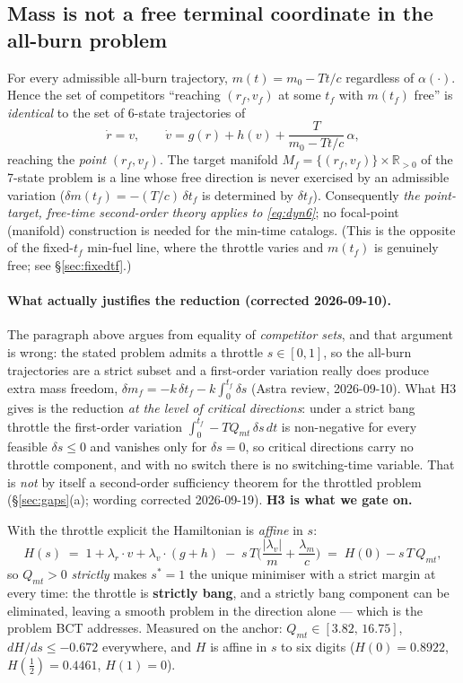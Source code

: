\documentclass[11pt]{article}
\theoremstyle{definition}
\newcommand{\R}{\mathbb{R}}
\newcommand{\lv}{\lambda_v}
\newcommand{\lr}{\lambda_r}
\newcommand{\lm}{\lambda_m}
\newcommand{\tf}{t_f}
\begin{document}
\subsection{Mass is not a free terminal coordinate in the all-burn problem}
For every admissible all-burn trajectory, $m(t)=m_0-Tt/c$ regardless of
$\alpha(\cdot)$. Hence the set of competitors ``reaching $(r_f,v_f)$ at some
$\tf$ with $m(\tf)$ free'' is \emph{identical} to the set of 6-state trajectories
of
\begin{equation}\label{eq:dyn6}
\dot r=v,\qquad \dot v=g(r)+h(v)+\frac{T}{m_0-Tt/c}\,\alpha,
\end{equation}
reaching the \emph{point} $(r_f,v_f)$. The target manifold
$M_f=\{(r_f,v_f)\}\times\R_{>0}$ of the 7-state problem is a line whose free
direction is never exercised by an admissible variation
($\delta m(\tf)=-(T/c)\,\delta\tf$ is determined by $\delta\tf$). Consequently
\emph{the point-target, free-time second-order theory applies to
\eqref{eq:dyn6}}; no focal-point (manifold) construction is needed for the
min-time catalogs. (This is the opposite of the fixed-$\tf$ min-fuel line, where
the throttle varies and $m(\tf)$ is genuinely free; see \S\ref{sec:fixedtf}.)

\paragraph{What actually justifies the reduction (corrected 2026-09-10).}
The paragraph above argues from equality of \emph{competitor sets}, and that
argument is wrong: the stated problem admits a throttle $s\in[0,1]$, so the
all-burn trajectories are a strict subset and a first-order variation really
does produce extra mass freedom,
$\delta m_f=-k\,\delta\tf-k\!\int_0^{\tf}\!\delta s$ (Astra review,
2026-09-10). What H3 gives is the reduction \emph{at the level of critical
directions}: under a strict bang throttle the first-order variation
$\int_0^{\tf}-TQ_{mt}\,\delta s\,dt$ is non-negative for every feasible
$\delta s\le0$ and vanishes only for $\delta s=0$, so critical directions carry
no throttle component, and with no switch there is no switching-time variable.
That is \emph{not} by itself a second-order sufficiency theorem for the
throttled problem (\S\ref{sec:gaps}(a); wording corrected 2026-09-19).
\textbf{H3 is what we gate on.}

With the throttle explicit the Hamiltonian is \emph{affine} in $s$:
\[
  H(s)\;=\;1+\lr\!\cdot\!v+\lv\!\cdot\!(g+h)\;-\;s\,T\Big(\frac{|\lv|}{m}+\frac{\lm}{c}\Big)
       \;=\;H(0)-s\,T\,Q_{mt},
\]
so $Q_{mt}>0$ \emph{strictly} makes $s^{*}=1$ the unique minimiser with a
strict margin at every time: the throttle is \textbf{strictly bang}, and a
strictly bang component can be eliminated, leaving a smooth problem in the
direction alone --- which is the problem BCT addresses. Measured on the anchor:
$Q_{mt}\in[3.82,\,16.75]$, $dH/ds\le-0.672$ everywhere, and $H$ is affine in
$s$ to six digits ($H(0)=0.8922$, $H(\tfrac12)=0.4461$, $H(1)=0$).
\end{document}
